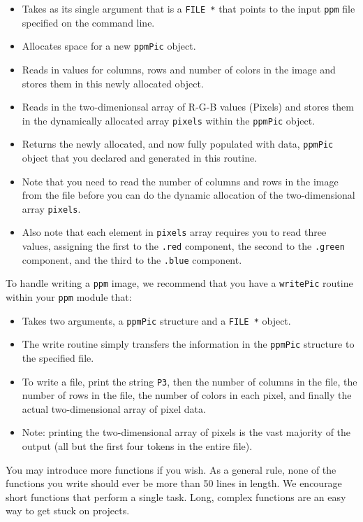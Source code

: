 \documentclass[12pt]{article}
\begin{document}
\begin{itemize}
\item Takes as its single argument that is a {\tt FILE *} that points to the 
input {\tt ppm} file specified on the command line.
\item Allocates space for a new {\tt ppmPic} object.
\item Reads in values for columns, rows and number of colors in the image and
stores them in this newly allocated object.
\item Reads in the two-dimenionsal array of R-G-B values (Pixels) and stores
them in the dynamically allocated array {\tt pixels} within the {\tt ppmPic}
object.
\item Returns the newly allocated, and now fully populated with data, 
{\tt ppmPic} object that you declared and generated in this routine.
\item Note that you need to read the number of columns and rows in the
image from the file before you can do the dynamic allocation of the 
two-dimensional array {\tt pixels}.
\item Also note that each element in {\tt pixels} array requires you to read
three values, assigning the first to the {\tt .red} component, the second
to the {\tt .green} component, and the third to the {\tt .blue} component.
\end{itemize}

To handle writing a {\tt ppm} image, we recommend that you have a
{\tt writePic} routine within your {\tt ppm} module that:

\begin{itemize}
\item Takes two arguments, a {\tt ppmPic} structure and a {\tt FILE *} object.
\item The write routine simply transfers the information in the {\tt ppmPic}
structure to the specified file.
\item To write a file, print the string {\tt P3}, then
the number of columns in the file, the number of rows in the file, the number
of colors in each pixel, and finally the actual two-dimensional array of 
pixel data.
\item Note: printing the two-dimensional array of pixels is the vast majority of
the output (all but the first four tokens in the entire file).
\end{itemize}

You may introduce more functions if you wish.  As a general rule, none of the
functions you write should ever be more than 50 lines in length.  We encourage
short functions that perform a single task.  Long, complex functions are an
easy way to get stuck on projects.
\end{document}
